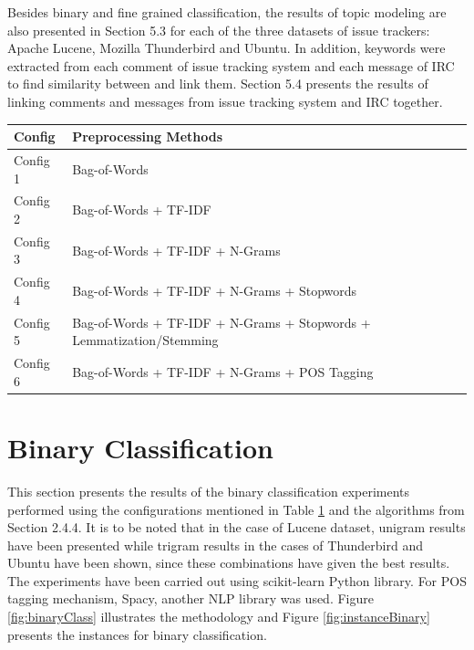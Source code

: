 \documentclass[a4paper,12pt,twoside]{report}
\begin{document}
\newline \newline
Besides binary and fine grained classification, the results of topic modeling are also presented in Section 5.3 for each of the three datasets of issue trackers: Apache Lucene, Mozilla Thunderbird and Ubuntu. In addition, keywords were extracted from each comment of issue tracking system and each message of \acs{IRC} to find similarity between and link them. Section 5.4 presents the results of linking comments and messages from issue tracking system and \acs{IRC} together. 

\begin{table} %
    \centering
    \begin{adjustbox}{max width=\columnwidth}
    \def\arraystretch{1} %
    \begin{tabular}{p{2cm} p{13cm}}
        \toprule
        \textbf{Config} & \textbf{Preprocessing Methods} \\
        \midrule
			Config 1 & Bag-of-Words \\
			Config 2 & Bag-of-Words + TF-IDF \\ 
			Config 3 & Bag-of-Words + TF-IDF + N-Grams \\
			Config 4 & Bag-of-Words + TF-IDF + N-Grams + Stopwords \\
			Config 5 & Bag-of-Words + TF-IDF + N-Grams + Stopwords + Lemmatization/Stemming \\
			Config 6 & Bag-of-Words + TF-IDF + N-Grams + \acs{POS} Tagging \\
        \midrule
    \end{tabular}
    \end{adjustbox}
    \label{tab:configurationNames}
\end{table} 

\section{Binary Classification}
This section presents the results of the binary classification experiments performed using the configurations mentioned in Table \ref{tab:configurationNames} and the algorithms from Section 2.4.4. It is to be noted that in the case of Lucene dataset, unigram results have been presented while trigram results in the cases of Thunderbird and Ubuntu have been shown, since these combinations have given the best results. The experiments have been carried out using scikit-learn Python library. For \acs{POS} tagging mechanism, Spacy, another \acs{NLP} library was used. Figure \ref{fig:binaryClass} illustrates the methodology and Figure \ref{fig:instanceBinary} presents the instances for binary classification. 
\end{document}
